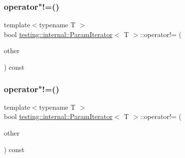 \mbox{\label{classtesting_1_1internal_1_1_param_iterator_a7a6aee04e8e44b5c8294929951cfac2b}} 
\subsubsection{\texorpdfstring{operator"!=()}{operator!=()}\hspace{0.1cm}{\footnotesize\ttfamily [1/3]}}
{\footnotesize\ttfamily template$<$typename T $>$ \\
bool \mbox{\hyperlink{classtesting_1_1internal_1_1_param_iterator}{testing\+::internal\+::\+Param\+Iterator}}$<$ T $>$\+::operator!= (\begin{DoxyParamCaption}\item[{const \mbox{\hyperlink{classtesting_1_1internal_1_1_param_iterator}{Param\+Iterator}}$<$ T $>$ \&}]{other }\end{DoxyParamCaption}) const\hspace{0.3cm}{\ttfamily [inline]}}

\mbox{\label{classtesting_1_1internal_1_1_param_iterator_a7a6aee04e8e44b5c8294929951cfac2b}} 
\subsubsection{\texorpdfstring{operator"!=()}{operator!=()}\hspace{0.1cm}{\footnotesize\ttfamily [2/3]}}
{\footnotesize\ttfamily template$<$typename T $>$ \\
bool \mbox{\hyperlink{classtesting_1_1internal_1_1_param_iterator}{testing\+::internal\+::\+Param\+Iterator}}$<$ T $>$\+::operator!= (\begin{DoxyParamCaption}\item[{const \mbox{\hyperlink{classtesting_1_1internal_1_1_param_iterator}{Param\+Iterator}}$<$ T $>$ \&}]{other }\end{DoxyParamCaption}) const\hspace{0.3cm}{\ttfamily [inline]}}


